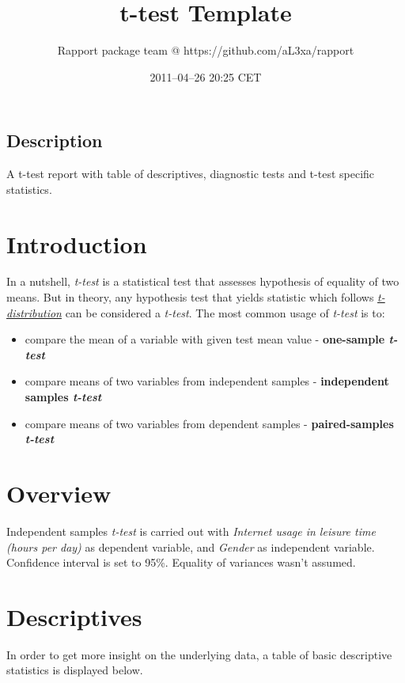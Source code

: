 \documentclass{article}
\title{t-test Template}
\author{Rapport package team @ https://github.com/aL3xa/rapport}
\date{2011--04--26 20:25 CET}
\begin{document}
\maketitle

\subsection{Description}

A t-test report with table of descriptives, diagnostic tests and t-test
specific statistics.

\section{Introduction}

In a nutshell, \emph{t-test} is a statistical test that assesses
hypothesis of equality of two means. But in theory, any hypothesis test
that yields statistic which follows
\href{https://en.wikipedia.org/wiki/Student\%27s\_t-distribution}{\emph{t-distribution}}
can be considered a \emph{t-test}. The most common usage of
\emph{t-test} is to:

\begin{itemize}
\item
  compare the mean of a variable with given test mean value -
  \textbf{one-sample \emph{t-test}}
\item
  compare means of two variables from independent samples -
  \textbf{independent samples \emph{t-test}}
\item
  compare means of two variables from dependent samples -
  \textbf{paired-samples \emph{t-test}}
\end{itemize}
\section{Overview}

Independent samples \emph{t-test} is carried out with \emph{Internet
usage in leisure time (hours per day)} as dependent variable, and
\emph{Gender} as independent variable. Confidence interval is set to
95\%. Equality of variances wasn't assumed.

\section{Descriptives}

In order to get more insight on the underlying data, a table of basic
descriptive statistics is displayed below.
\end{document}
